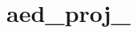 \chapter{aed\+\_\+proj\+\_}
\hypertarget{md__r_e_a_d_m_e}{}\label{md__r_e_a_d_m_e}
\label{md__r_e_a_d_m_e_autotoc_md0}%
%
